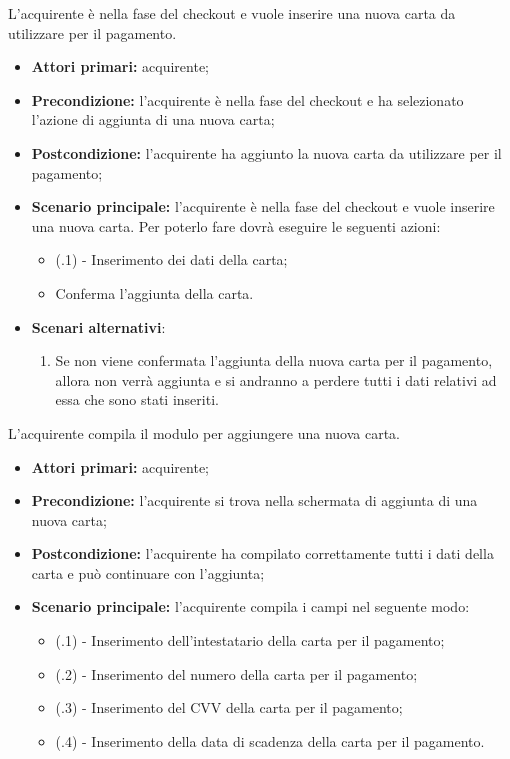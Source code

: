 
L'acquirente è nella fase del checkout e vuole inserire una nuova carta da utilizzare per il pagamento.
\begin{itemize}
    \item \textbf{Attori primari:} acquirente;
    \item \textbf{Precondizione:} l'acquirente è nella fase del checkout e ha selezionato l'azione di aggiunta di una nuova carta;
    \item \textbf{Postcondizione:} l'acquirente ha aggiunto la nuova carta da utilizzare per il pagamento;
    \item \textbf{Scenario principale:} l'acquirente è nella fase del checkout e vuole inserire una nuova carta. Per poterlo fare dovrà eseguire le seguenti azioni:
    \begin{itemize}
        \item (\actualUC.1) - Inserimento dei dati della carta;
        \item Conferma l'aggiunta della carta.
    \end{itemize}
    \item \textbf{Scenari alternativi}:
    \begin{enumerate}[label=\lett]
        \item Se non viene confermata l'aggiunta della nuova carta per il pagamento, allora non verrà aggiunta e si andranno a perdere tutti i dati relativi ad essa che sono stati inseriti.
    \end{enumerate}
\end{itemize}

\resetSubUC

L'acquirente compila il modulo per aggiungere una nuova carta.
\begin{itemize}
	\item \textbf{Attori primari:} acquirente;
	\item \textbf{Precondizione:} l'acquirente si trova nella schermata di aggiunta di una nuova carta;
	\item \textbf{Postcondizione:} l'acquirente ha compilato correttamente tutti i dati della carta e può continuare con l'aggiunta;
	\item \textbf{Scenario principale:} l'acquirente compila i campi nel seguente modo:
	\begin{itemize}
		\item (\actualSubUC.1) - Inserimento dell'intestatario della carta per il pagamento;
		\item (\actualSubUC.2) - Inserimento del numero della carta per il pagamento;
		\item (\actualSubUC.3) - Inserimento del CVV della carta per il pagamento;
		\item (\actualSubUC.4) - Inserimento della data di scadenza della carta per il pagamento.
	\end{itemize}
\end{itemize}

